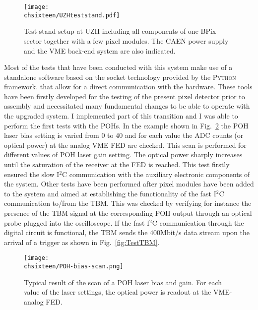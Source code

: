 \begin{figure}[!htb]
 \begin{center}
 \texttt{[image: \\chsixteen/UZHteststand.pdf]}
 \end{center}
 \caption{Test stand setup at UZH including all components of one BPix sector together with a few pixel modules. The CAEN power supply and the VME back-end system are also indicated.}
 \label{fig:TestStandUZH}
\end{figure} 

Most of the tests that have been conducted with this system make use of a standalone software based on the socket technology provided by the \textsc{Python} framework.
that allow for a direct communication with the hardware. 
These tools have been firstly developed for the testing of the present pixel detector prior to assembly\cite{Caminada:2010gsa} and necessitated many fundamental changes to be able to operate with the upgraded system.
I implemented part of this transition and I was able to perform the first tests with the POHs.
In the example shown in Fig.~\ref{fig:TestPOH} the POH laser bias setting is varied from 0 to 40 and for each value the ADC counts (or optical power) at the analog VME FED are checked.
This scan is performed for different values of POH laser gain setting.
The optical power sharply increases until the saturation of the receiver at the FED is reached.
This test firstly ensured the slow I$^2$C communication with the auxiliary electronic components of the system.
Other tests have been performed after pixel modules have been added to the system and  aimed at establishing the functionality of the fast I$^2$C communication to/from the TBM.
This was checked by verifying for instance the presence of the TBM signal at the corresponding POH output through an optical probe plugged into the oscilloscope.
If the fast I$^2$C communication through the digital circuit is functional, the TBM sends the 400\unit{Mbit/s} data stream upon the arrival of a trigger as shown in Fig.~\ref{fig:TestTBM}.

\begin{figure}[!htb]
 \begin{center}
  \texttt{[image: \\chsixteen/POH-bias-scan.png]}
 \end{center}
 \caption{Typical result of the scan of a POH laser bias and gain. For each value of the laser settings, the optical power is readout at the VME-analog FED.}
 \label{fig:TestPOH}
\end{figure} 

